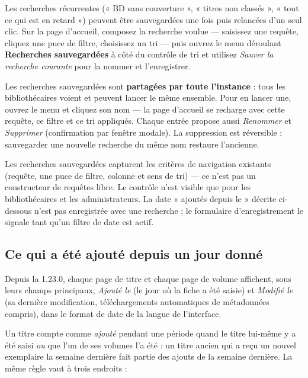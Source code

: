 Les recherches récurrentes (« BD sans couverture », « titres non
classés », « tout ce qui est en retard ») peuvent être sauvegardées
une fois puis relancées d'un seul clic. Sur la page d'accueil,
composez la recherche voulue — saisissez une requête, cliquez une
puce de filtre, choisissez un tri — puis ouvrez le menu déroulant
\textbf{Recherches sauvegardées} à côté du contrôle de tri et utilisez
\emph{Sauver la recherche courante} pour la nommer et l'enregistrer.

Les recherches sauvegardées sont \textbf{partagées par toute
l'instance} : tous les bibliothécaires voient et peuvent lancer le
même ensemble. Pour en lancer une, ouvrez le menu et cliquez son nom
— la page d'accueil se recharge avec cette requête, ce filtre et ce
tri appliqués. Chaque entrée propose aussi \emph{Renommer} et
\emph{Supprimer} (confirmation par fenêtre modale). La suppression est
réversible : sauvegarder une nouvelle recherche du même nom restaure
l'ancienne.

\begin{note}
Les recherches sauvegardées capturent les critères de navigation
existants (requête, une puce de filtre, colonne et sens de tri) — ce
n'est pas un constructeur de requêtes libre. Le contrôle n'est visible
que pour les bibliothécaires et les administrateurs. La date « ajoutés
depuis le » décrite ci-dessous n'est pas enregistrée avec une
recherche ; le formulaire d'enregistrement le signale tant qu'un filtre
de date est actif.
\end{note}

\subsection{Ce qui a été ajouté depuis un jour donné}\label{sec:added-since}

Depuis la 1.23.0, chaque page de titre et chaque page de volume
affichent, sous leurs champs principaux, \emph{Ajouté le} (le jour où
la fiche a été saisie) et \emph{Modifié le} (sa dernière modification,
téléchargements automatiques de métadonnées compris), dans le format
de date de la langue de l'interface.

Un titre compte comme \emph{ajouté} pendant une période quand le titre
lui-même y a été saisi \emph{ou} que l'un de ses volumes l'a été : un
titre ancien qui a reçu un nouvel exemplaire la semaine dernière fait
partie des ajouts de la semaine dernière. La même règle vaut à trois
endroits :

